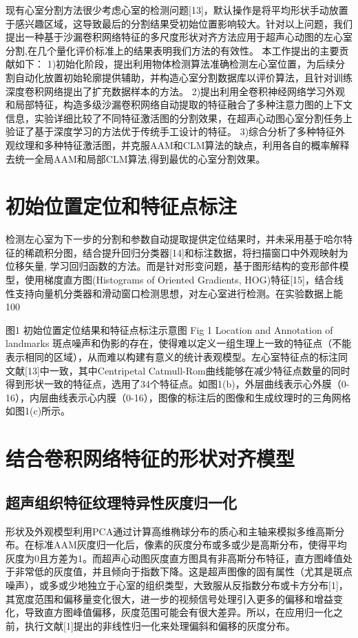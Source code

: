 现有心室分割方法很少考虑心室的检测问题[13]，默认操作是将平均形状手动放置于感兴趣区域，这导致最后的分割结果受初始位置影响较大。针对以上问题，我们提出一种基于沙漏卷积网络特征的多尺度形状对齐方法应用于超声心动图的左心室分割,在几个量化评价标准上的结果表明我们方法的有效性。
本工作提出的主要贡献如下：
1)初始化阶段，提出利用物体检测算法准确检测左心室位置，为后续分割自动化放置初始轮廓提供辅助，并构造心室分割数据库以评价算法，且针对训练深度卷积网络提出了扩充数据样本的方法。
2)提出利用全卷积神经网络学习外观和局部特征，构造多级沙漏卷积网络自动提取的特征融合了多种注意力图的上下文信息，实验详细比较了不同特征激活图的分割效果，在超声心动图心室分割任务上验证了基于深度学习的方法优于传统手工设计的特征。
3)综合分析了多种特征外观纹理和多种特征激活图，并克服AAM和CLM算法的缺点，利用各自的概率解释去统一全局AAM和局部CLM算法,得到最优的心室分割效果。
\section{初始位置定位和特征点标注}

检测左心室为下一步的分割和参数自动提取提供定位结果时，并未采用基于哈尔特征的稀疏积分图，结合提升回归分类器[14]和标注数据，将扫描窗口中外观映射为位移矢量, 学习回归函数的方法。而是针对形变问题，基于图形结构的变形部件模型，使用梯度直方图(Histograms of Oriented Gradients, HOG)特征[15]，结合线性支持向量机分类器和滑动窗口检测思想，对左心室进行检测。在实验数据上能100%
 
图1 初始位置定位结果和特征点标注示意图
Fig 1 Location and Annotation of landmarks
斑点噪声和伪影的存在，使得难以定义一组生理上一致的特征点（不能表示相同的区域），从而难以构建有意义的统计表观模型。左心室特征点的标注同文献[13]中一致，其中Centripetal Catmull-Rom曲线能够在减少特征点数量的同时得到形状一致的特征点，选用了34个特征点。如图1(b)，外层曲线表示心外膜（0-16），内层曲线表示心内膜（0-16），图像的标注后的图像和生成纹理时的三角网格如图1(c)所示。

\section{结合卷积网络特征的形状对齐模型} 

\subsection{超声组织特征纹理特异性灰度归一化} 
形状及外观模型利用PCA通过计算高维椭球分布的质心和主轴来模拟多维高斯分布。在标准AAM灰度归一化后，像素的灰度分布或多或少是高斯分布，使得平均灰度为0且方差为1。而超声心动图灰度直方图具有非高斯分布特征，直方图峰值处于非常低的灰度值，并且倾向于指数下降。这是超声图像的固有属性（尤其是斑点噪声），或多或少地独立于心室的组织类型，大致服从反指数分布或卡方分布[1]，其宽度范围和偏移量变化很大，进一步的视频信号处理引入更多的偏移和增益变化，导致直方图峰值偏移，灰度范围可能会有很大差异。所以，在应用归一化之前，执行文献[1]提出的非线性归一化来处理偏斜和偏移的灰度分布。

